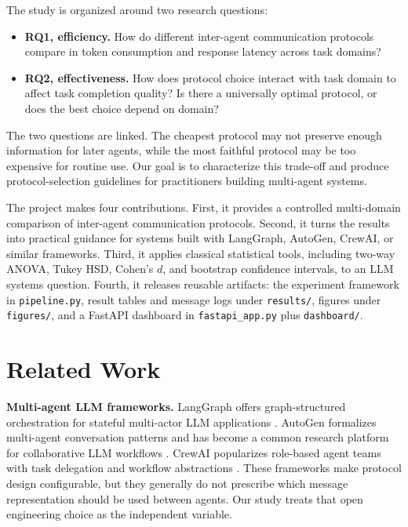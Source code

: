 \documentclass[11pt]{article}
\begin{document}
The study is organized around two research questions:

\begin{itemize}
  \item \textbf{RQ1, efficiency.} How do different inter-agent communication protocols compare in token consumption and response latency across task domains?
  \item \textbf{RQ2, effectiveness.} How does protocol choice interact with task domain to affect task completion quality? Is there a universally optimal protocol, or does the best choice depend on domain?
\end{itemize}

The two questions are linked. The cheapest protocol may not preserve enough information for later agents, while the most faithful protocol may be too expensive for routine use. Our goal is to characterize this trade-off and produce protocol-selection guidelines for practitioners building multi-agent systems.

The project makes four contributions. First, it provides a controlled multi-domain comparison of inter-agent communication protocols. Second, it turns the results into practical guidance for systems built with LangGraph, AutoGen, CrewAI, or similar frameworks. Third, it applies classical statistical tools, including two-way ANOVA, Tukey HSD, Cohen's $d$, and bootstrap confidence intervals, to an LLM systems question. Fourth, it releases reusable artifacts: the experiment framework in \texttt{pipeline.py}, result tables and message logs under \texttt{results/}, figures under \texttt{figures/}, and a FastAPI dashboard in \texttt{fastapi\_app.py} plus \texttt{dashboard/}.

\section{Related Work}

\textbf{Multi-agent LLM frameworks.} LangGraph offers graph-structured orchestration for stateful multi-actor LLM applications \cite{langgraph}. AutoGen formalizes multi-agent conversation patterns and has become a common research platform for collaborative LLM workflows \cite{autogen}. CrewAI popularizes role-based agent teams with task delegation and workflow abstractions \cite{crewai}. These frameworks make protocol design configurable, but they generally do not prescribe which message representation should be used between agents. Our study treats that open engineering choice as the independent variable.
\end{document}
